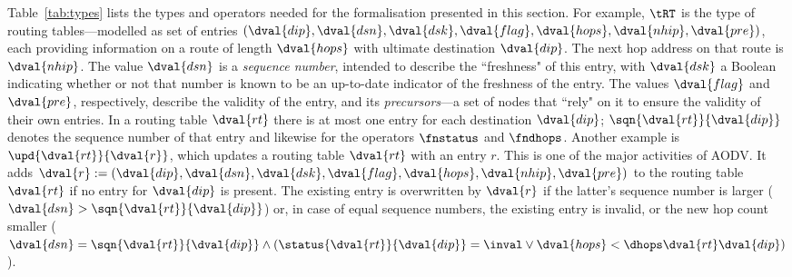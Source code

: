 \documentclass[envcountsame,envcountsect,orivec,runningheads]{llncs}
\begin{document}
{\renewcommand{\ip}{\dval{ip}}
\renewcommand{\dip}{\dval{dip}}
\renewcommand{\oip}{\dval{oip}}
\renewcommand{\sip}{\dval{sip}}
\renewcommand{\rip}{\dval{rip}}
\renewcommand{\rt}{\dval{rt}}
  \newcommand{\nrt}{\dval{nrt}}
\renewcommand{\r}{\dval{r}}
  \newcommand{\s}{\dval{s}}
  \newcommand{\nr}{\dval{nr}}
  \newcommand{\ns}{\dval{ns}}
\renewcommand{\osn}{\dval{osn}}
\renewcommand{\dsn}{\dval{dsn}}
\renewcommand{\rsn}{\dval{rsn}}
\renewcommand{\dsk}{\dval{dsk}}
\renewcommand{\flag}{\dval{flag}}
\renewcommand{\hops}{\dval{hops}}
\renewcommand{\nhip}{\dval{nhip}}
\renewcommand{\pre}{\dval{pre}}
  \newcommand{\npre}{\dval{npre}}
\renewcommand{\dests}{\dval{dests}}
\renewcommand{\rreqid}{\dval{rreqid}}
\renewcommand{\rreqs}{\dval{rreqs}}

Table~\ref{tab:types} lists the types and operators needed for the formalisation presented in this section.
For example, $\tRT$ is the type of routing tables---modelled as set of
entries $(\dip, \dsn, \dsk, \flag, \hops, \nhip, \pre)$, each providing
information on a route of length $\hops$ with ultimate destination
$\dip$.  The next hop address on that route is $\nhip$. The value
$\dsn$ is a \emph{sequence number}, intended to describe the ``freshness" of
this entry, with $\dsk$ a Boolean indicating whether or not that number
is known to be an up-to-date indicator of the freshness of the entry. The values
$\flag$ and $\pre$, respectively, describe
the validity of the entry, and its \mbox{\emph{precursors}}---a
set of nodes that ``rely" on it to ensure the validity of their own entries.  In a
routing table $\rt$ there is at most one entry for each destination
$\dip$; $\sqn{\rt}{\dip}$ denotes the sequence number of that entry
and likewise for the
operators $\fnstatus$ and $\fndhops$.  
Another example is $\upd{\rt}{\r}$, which updates a routing table $\rt$ with
an entry $r$. This is one of the major activities of AODV\@.
It adds $\r:=(\dip, \dsn, \dsk, \flag, \hops, \nhip,
\pre)$ to the routing table $\rt$ if no entry for $\dip$ is
present. The existing entry is overwritten by $\r$ if the latter's
sequence number is larger ($\dsn > \sqn{\rt}{\dip}$) or, in case of
equal sequence numbers, the existing entry is invalid, or the new hop
count smaller ($\dsn = \sqn{\rt}{\dip} \wedge
(\status{\rt}{\dip}=\inval \vee \hops < \dhops\rt\dip)$).
}
\end{document}
